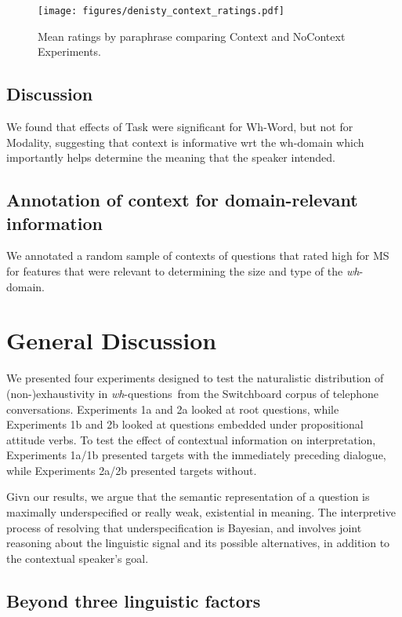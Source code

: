 \documentclass[12pt,letterpaper,table,svgnames,dvipsnames]{article}
\newcommand{\mm}[1]{\textcolor{teal}{[mm: #1]}}
\newcommand{\whqs}{\emph{wh}-questions~}
\begin{document}

\begin{figure}[h!]
\centering
\centering
\texttt{[image: figures/denisty\_context\_ratings.pdf]}
\caption{Mean ratings by paraphrase comparing Context and NoContext Experiments.}
\label{density_kld_overall}
\end{figure}


\subsection{Discussion}
We found that effects of Task were significant for Wh-Word, but not for Modality, suggesting that context is informative wrt the wh-domain which importantly helps determine the meaning that the speaker intended. 


\subsection{Annotation of context for domain-relevant information}
We annotated a random sample of contexts of questions that rated high for MS for features that were relevant to determining the size and type of the \emph{wh}-domain.

\section{General Discussion}

We presented four experiments designed to test the naturalistic distribution of (non-)exhaustivity in \whqs from the Switchboard corpus of telephone conversations. Experiments 1a and 2a looked at root questions, while Experiments 1b and 2b looked at questions embedded under propositional attitude verbs. To test the effect of contextual information on interpretation, Experiments 1a/1b presented targets with the immediately preceding dialogue, while Experiments 2a/2b presented targets without.

Givn our results, we argue that the semantic representation of a question is maximally underspecified or really weak, existential in meaning. The interpretive process of resolving that underspecification is Bayesian, and involves joint reasoning about the linguistic signal and its possible alternatives, in addition to the contextual speaker's goal.



\subsection{Beyond three linguistic factors}
\end{document}

